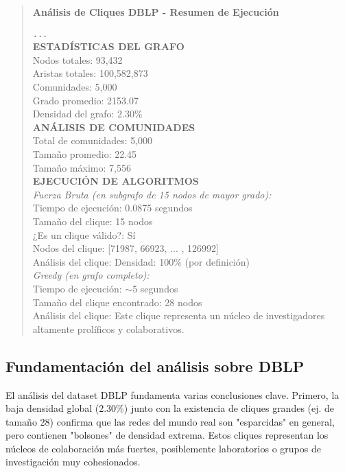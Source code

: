 \documentclass[12pt,a4paper]{report}
\begin{document}
\begin{quote}
\textbf{Análisis de Cliques DBLP - Resumen de Ejecución}

\texttt{...} \\
\textbf{ESTADÍSTICAS DEL GRAFO}\\
Nodos totales: 93,432\\
Aristas totales: 100,582,873\\
Comunidades: 5,000\\
Grado promedio: 2153.07\\
Densidad del grafo: 2.30\%\\

\textbf{ANÁLISIS DE COMUNIDADES}\\
Total de comunidades: 5,000\\
Tamaño promedio: 22.45\\
Tamaño máximo: 7,556\\

\textbf{EJECUCIÓN DE ALGORITMOS}\\
\textit{Fuerza Bruta (en subgrafo de 15 nodos de mayor grado):}\\
Tiempo de ejecución: 0.0875 segundos\\
Tamaño del clique: 15 nodos\\
¿Es un clique válido?: Sí\\
Nodos del clique: [71987, 66923, ... , 126992]\\
Análisis del clique: Densidad: 100\% (por definición)\\

\textit{Greedy (en grafo completo):}\\
Tiempo de ejecución: $\sim$5 segundos \\
Tamaño del clique encontrado: 28 nodos \\
Análisis del clique: Este clique representa un núcleo de investigadores altamente prolíficos y colaborativos.
\end{quote}

\subsection{Fundamentación del análisis sobre DBLP}
El análisis del dataset DBLP fundamenta varias conclusiones clave. Primero, la baja densidad global (2.30\%) junto con la existencia de cliques grandes (ej. de tamaño 28) confirma que las redes del mundo real son "esparcidas" en general, pero contienen "bolsones" de densidad extrema. Estos cliques representan los núcleos de colaboración más fuertes, posiblemente laboratorios o grupos de investigación muy cohesionados.
\end{document}
